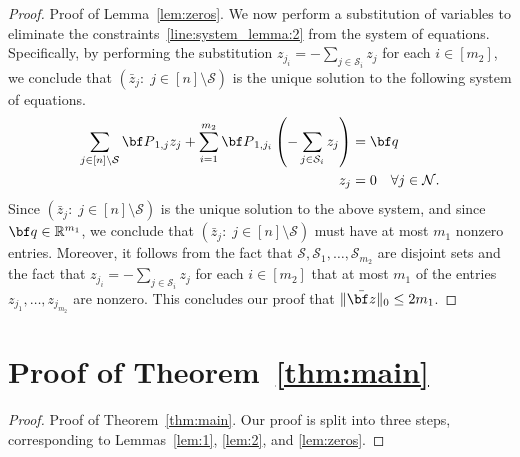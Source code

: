 \documentclass[nonblindrev,mnsc]{informs3} %
\newcommand{\bq}{{\bf q}}
\newcommand{\bz}{{\bf z}}
\newcommand{\bbp}{{\bf P}}
\def\Real{\mathbb{R}}
\let\R\Real
\begin{document}
\begin{APPENDICES}
\begin{proof}{Proof of Lemma~\ref{lem:zeros}. }
We now perform a substitution of variables to eliminate the constraints~\eqref{line:system_lemma:2} from the system of equations. Specifically, by performing the  substitution $z_{j_i} = - \sum_{j \in \mathcal{S}_i} z_{j}$ for each $i \in [m_2]$, we conclude that $(\bar{z}_j: \; j \in [n] \setminus \mathcal{S})$ is the unique solution to the following system of equations. %
\begin{align*}
\sum_{j \in [n] \setminus \mathcal{S}} \bbp_{1,j} z_j + \sum_{i=1}^{m_2} \bbp_{1,j_i} \left(- \sum_{j \in \mathcal{S}_i} z_{j} \right) &= \bq\\
z_j &= 0 \quad \forall j \in \mathcal{N}. 
\end{align*}
Since $(\bar{z}_j: \; j \in [n] \setminus \mathcal{S})$ is the unique solution to the above system, and since $\bq \in \R^{m_1}$, we conclude that $(\bar{z}_j: \; j \in [n] \setminus \mathcal{S})$ must have at most $m_1$ nonzero entries. Moreover, it follows from the fact that $\mathcal{S},\mathcal{S}_1,\ldots,\mathcal{S}_{m_2}$ are disjoint sets and the fact that  $z_{j_i} = - \sum_{j \in \mathcal{S}_i} z_{j}$ for each $i \in [m_2]$ that at most $m_1$ of the entries $z_{j_1},\ldots,z_{j_{m_2}}$ are nonzero. This concludes our proof that $\| \bar{\bz} \|_0 \le 2 m_1$. 
\halmos
\end{proof}




\section{Proof of Theorem~\ref{thm:main}} \label{appx:proof_thm12}


\begin{proof}{Proof of Theorem~\ref{thm:main}. } Our proof is split into three steps, corresponding to Lemmas~\ref{lem:1}, \ref{lem:2}, and \ref{lem:zeros}. 

\vspace{0.5em}


\end{proof}
\end{APPENDICES}
\end{document}

